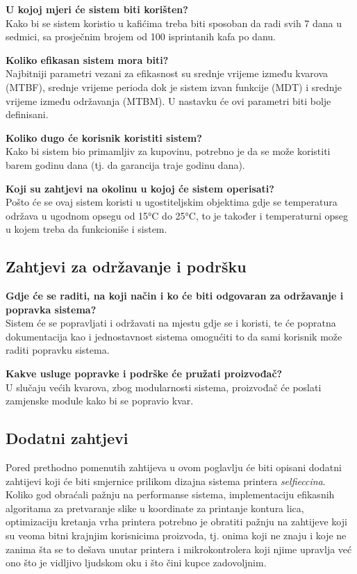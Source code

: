 \documentclass[12pt]{article}
\begin{document}
\textbf{U kojoj mjeri će sistem biti korišten?}\\
Kako bi se sistem koristio u kafićima treba biti sposoban da radi svih 7 dana u sedmici, sa prosječnim brojem od 100 isprintanih kafa po danu.

\textbf{Koliko efikasan sistem mora biti?}\\
Najbitniji parametri vezani za efikasnost su srednje vrijeme između kvarova (MTBF), srednje vrijeme perioda dok je sistem izvan funkcije (MDT) i srednje vrijeme između održavanja (MTBM). U nastavku će ovi parametri biti bolje definisani.

\textbf{Koliko dugo će korisnik koristiti sistem?}\\
Kako bi sistem bio primamljiv za kupovinu, potrebno je da se može koristiti barem godinu dana (tj. da garancija traje godinu dana).

\textbf{Koji su zahtjevi na okolinu u kojoj će sistem operisati?}\\
Pošto će se ovaj sistem koristi u ugostiteljskim objektima gdje se temperatura održava u ugodnom opsegu od 15°C do 25°C, to je također i temperaturni opseg u kojem treba da funkcioniše i sistem.

\subsection{Zahtjevi za održavanje i podršku}
\textbf{Gdje će se raditi, na koji način i ko će biti odgovaran za održavanje i popravka sistema?}\\
Sistem će se popravljati i održavati na mjestu gdje se i koristi, te će popratna dokumentacija kao i jednostavnost sistema omogućiti to da sami korisnik može raditi popravku sistema.

\textbf{Kakve usluge popravke i podrške će pružati proizvođač?}\\
U slučaju većih kvarova, zbog modularnosti sistema, proizvođač će poslati zamjenske module kako bi se popravio kvar.  

\subsection{Dodatni zahtjevi}
Pored prethodno pomenutih zahtijeva u ovom poglavlju \'ce biti opisani dodatni zahtijevi koji \'ce biti smjernice prilikom dizajna sistema printera \textit{selfieccina}. Koliko god obra\'cali pa\v{z}nju na performanse sistema, implementaciju efikasnih algoritama za pretvaranje slike u koordinate za printanje kontura lica, optimizaciju kretanja vrha printera potrebno je obratiti pa\v{z}nju na zahtijeve koji su veoma bitni krajnjim korisnicima proizvoda, tj. onima koji ne znaju i koje ne zanima \v{s}ta se to de\v{s}ava unutar printera i mikrokontrolera koji njime upravlja ve\'c ono \v{s}to je vidljivo ljudskom oku i \v{s}to \v{c}ini kupce zadovoljnim.
\end{document}

